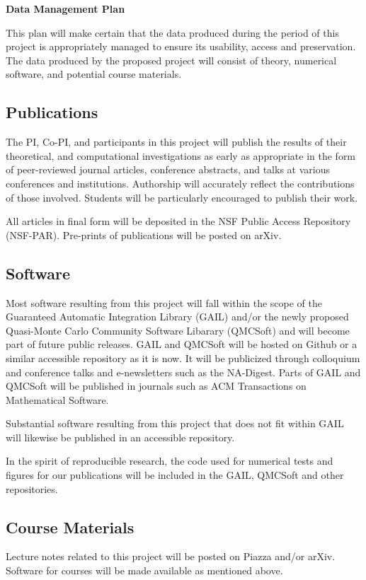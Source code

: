 \documentclass[11pt]{NSFamsart}
\begin{document}

\centerline{\textbf{\Large Data Management Plan}}

\bigskip



This plan will make certain that the data produced during the period of this project is appropriately managed to ensure its usability, access and preservation.  The data produced by the proposed project will consist of theory, numerical software, and potential course materials. 

\subsection*{Publications} The PI, Co-PI, and participants in this project will publish the results of their theoretical, and 
computational investigations as early as appropriate in the form of peer-reviewed journal articles, 
conference abstracts, and talks at various conferences and institutions. Authorship will accurately 
reflect the contributions of those involved.  Students will be particularly encouraged to publish their 
work. 

All articles in final form will be deposited in the NSF Public Access Repository (NSF-PAR).  Pre-prints of publications will be posted on arXiv.

\subsection*{Software} Most software resulting from this project will fall within the scope of the Guaranteed Automatic 
Integration Library (GAIL) and/or the newly proposed Quasi-Monte Carlo Community Software Libarary (QMCSoft) and will become part of future public releases.  GAIL and QMCSoft will be hosted on 
Github or a similar accessible repository as it is now.  It will be publicized through colloquium and 
conference talks and e-newsletters such as the NA-Digest.  Parts of GAIL and QMCSoft will be published in journals such as ACM Transactions on Mathematical Software.

Substantial software resulting from this project that does not fit within GAIL will likewise be 
published in an accessible repository.

In the spirit of reproducible research, the code used for numerical tests and figures for our 
publications will be included in the GAIL, QMCSoft and other repositories.

\subsection*{Course Materials} Lecture notes related to this project will be posted on Piazza and/or arXiv.  Software for courses will be made available as mentioned above.
\end{document}
